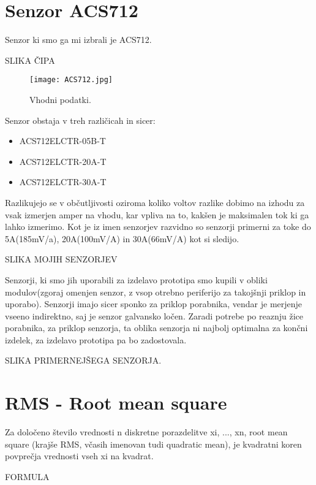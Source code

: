 \documentclass[12pt,a4paper,titlepage,openany]{report}
\begin{document}
\section{Senzor ACS712}
Senzor ki smo ga mi izbrali je ACS712.



SLIKA ČIPA

\begin{figure}[h!]
\begin{center}
\texttt{[image: ACS712.jpg]}
\end{center}
\caption{Vhodni podatki.}\label{slika:acs}
\end{figure}

Senzor obstaja v treh različicah in sicer:

\begin{itemize}
\item ACS712ELCTR-05B-T
\item ACS712ELCTR-20A-T
\item ACS712ELCTR-30A-T
\end{itemize}

Razlikujejo se v občutljivosti oziroma koliko voltov razlike dobimo na izhodu za vsak izmerjen amper na vhodu, kar vpliva na to, kakšen je maksimalen tok ki ga lahko izmerimo. Kot je iz imen senzorjev razvidno so senzorji primerni za toke do 5A(185mV/a), 20A(100mV/A) in 30A(66mV/A) kot si sledijo.


SLIKA MOJIH SENZORJEV

Senzorji, ki smo jih uporabili za izdelavo prototipa smo kupili v obliki modulov(zgoraj omenjen senzor, z vsop otrebno periferijo za takojšnji priklop in uporabo). Senzorji imajo sicer sponko za priklop porabnika, vendar je merjenje vseeno indirektno, saj je senzor galvansko ločen. Zaradi potrebe po reaznju žice porabnika, za priklop senzorja, ta oblika senzorja ni najbolj optimalna za končni izdelek, za izdelavo prototipa pa bo zadostovala.

SLIKA PRIMERNEJŠEGA SENZORJA.

\section{RMS - Root mean square}

Za določeno število vrednosti n diskretne porazdelitve xi, ..., xn, root mean square (krajše RMS, včasih imenovan tudi
quadratic mean), je kvadratni koren povprečja vrednosti vseh xi na kvadrat.

FORMULA
\end{document}
